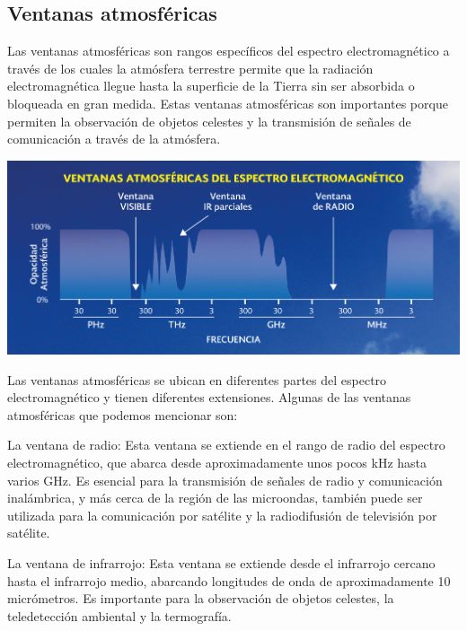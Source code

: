 \documentclass[a4paper,12pt]{article}
\newenvironment{Figure}
  {\par\medskip\noindent\minipage{\linewidth}}
  {\endminipage\par\medskip}
\begin{document}
\begin{multicols*}{2}

\section*{Ventanas atmosféricas}

Las ventanas atmosféricas son rangos específicos del espectro electromagnético a través de los cuales la atmósfera terrestre permite que la radiación electromagnética llegue hasta la superficie de la Tierra sin ser absorbida o bloqueada en gran medida. Estas ventanas atmosféricas son importantes porque permiten la observación de objetos celestes y la transmisión de señales de comunicación a través de la atmósfera. 

\begin{Figure}
    \centering
    \includegraphics[width=1\linewidth]{VentanasAtmosfericas.png}
    \label{fig: ventAtmos}
\end{Figure}

Las ventanas atmosféricas se ubican en diferentes partes del espectro electromagnético y tienen diferentes extensiones. Algunas de las ventanas atmosféricas que podemos mencionar son:

La ventana de radio: Esta ventana se extiende en el rango de radio del espectro electromagnético, que abarca desde aproximadamente unos pocos kHz hasta varios GHz. Es esencial para la transmisión de señales de radio y comunicación inalámbrica, y más cerca de la región de las microondas, también puede ser utilizada para la comunicación por satélite y la radiodifusión de televisión por satélite.

La ventana de infrarrojo: Esta ventana se extiende desde el infrarrojo cercano hasta el infrarrojo medio, abarcando longitudes de onda de aproximadamente 10 micrómetros. Es importante para la observación de objetos celestes, la teledetección ambiental y la termografía.


\end{multicols*}
\end{document}
